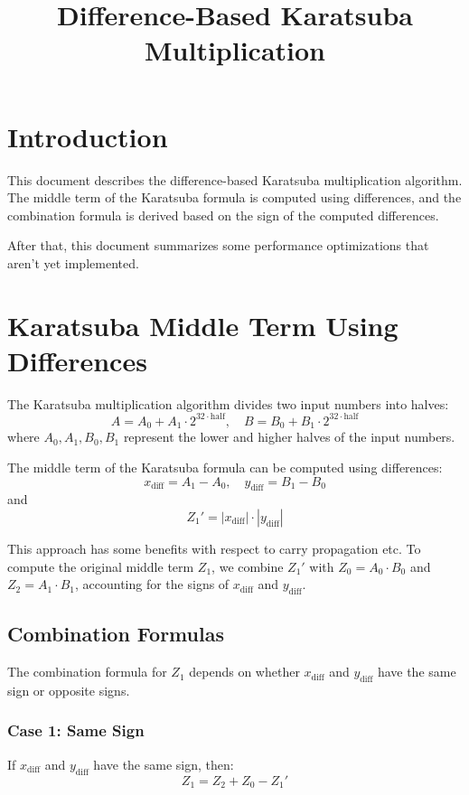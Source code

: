 \documentclass[12pt]{article}
\title{Difference-Based Karatsuba Multiplication}
\author{}
\date{}
\begin{document}
\maketitle

\section*{Introduction}
This document describes the difference-based Karatsuba multiplication algorithm. The middle term of the Karatsuba formula is computed using differences, and the combination formula is derived based on the sign of the computed differences.

After that, this document summarizes some performance optimizations that aren't yet implemented.

\section*{Karatsuba Middle Term Using Differences}
The Karatsuba multiplication algorithm divides two input numbers into halves:
\[
A = A_0 + A_1 \cdot 2^{32 \cdot \text{half}}, \quad B = B_0 + B_1 \cdot 2^{32 \cdot \text{half}}
\]
where \( A_0, A_1, B_0, B_1 \) represent the lower and higher halves of the input numbers.

The middle term of the Karatsuba formula can be computed using differences:
\[
x_{\text{diff}} = A_1 - A_0, \quad y_{\text{diff}} = B_1 - B_0
\]
and
\[
Z_1' = |x_{\text{diff}}| \cdot |y_{\text{diff}}|
\]

This approach has some benefits with respect to carry propagation etc.  To compute the original middle term \( Z_1 \), we combine \( Z_1' \) with \( Z_0 = A_0 \cdot B_0 \) and \( Z_2 = A_1 \cdot B_1 \), accounting for the signs of \( x_{\text{diff}} \) and \( y_{\text{diff}} \).

\subsection*{Combination Formulas}
The combination formula for \( Z_1 \) depends on whether \( x_{\text{diff}} \) and \( y_{\text{diff}} \) have the same sign or opposite signs.

\subsubsection*{Case 1: Same Sign}
If \( x_{\text{diff}} \) and \( y_{\text{diff}} \) have the same sign, then:
\[
Z_1 = Z_2 + Z_0 - Z_1'
\]
\end{document}
